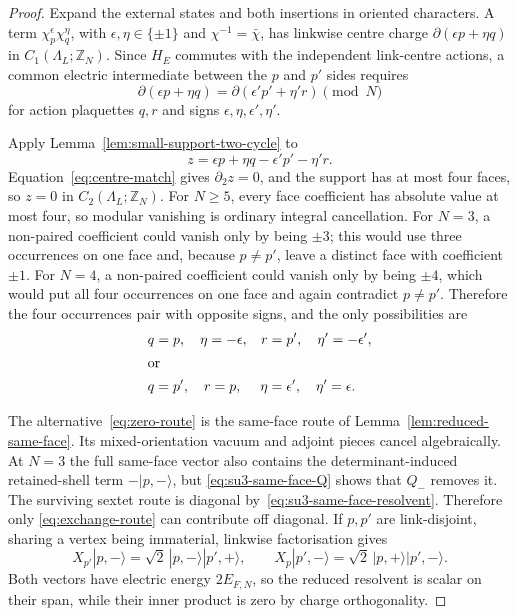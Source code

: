 \documentclass[11pt]{article}
\theoremstyle{plain}
\theoremstyle{definition}
\theoremstyle{remark}
\begin{document}
\begin{proof}
Expand the external states and both insertions in oriented characters. A term
$\chi_p^\epsilon\chi_q^\eta$, with
$\epsilon,\eta\in\{\pm1\}$ and $\chi^{-1}=\bar\chi$, has linkwise
centre charge $\partial(\epsilon p+\eta q)$ in
$C_1(\Lambda_L;\mathbb Z_N)$. Since $H_E$ commutes with the independent
link-centre actions, a common electric intermediate between the $p$ and $p'$
sides requires
\begin{equation}\label{eq:centre-match}
 \partial(\epsilon p+\eta q)
 =\partial(\epsilon'p'+\eta'r)\pmod N
\end{equation}
for action plaquettes $q,r$ and signs
$\epsilon,\eta,\epsilon',\eta'$.

Apply Lemma~\ref{lem:small-support-two-cycle} to
\[
 z=\epsilon p+\eta q-\epsilon'p'-\eta'r .
\]
Equation~\eqref{eq:centre-match} gives $\partial_2z=0$, and the support has at
most four faces, so $z=0$ in $C_2(\Lambda_L;\mathbb Z_N)$. For $N\ge5$,
every face coefficient has absolute value at most four, so modular vanishing
is ordinary integral cancellation. For $N=3$, a non-paired coefficient could
vanish only by being $\pm3$; this would use three occurrences on one face and,
because $p\ne p'$, leave a distinct face with coefficient $\pm1$. For $N=4$,
a non-paired coefficient could vanish only by being $\pm4$, which would put
all four occurrences on one face and again contradict $p\ne p'$. Therefore
the four occurrences pair with opposite signs, and the only possibilities are
\begin{align}
 q&=p,\quad \eta=-\epsilon,
 &r&=p',\quad \eta'=-\epsilon',
 \label{eq:zero-route}\\
 \intertext{or}
 q&=p',\quad r=p,
 &\eta&=\epsilon',\quad \eta'=\epsilon .
 \label{eq:exchange-route}
\end{align}

The alternative~\eqref{eq:zero-route} is the same-face route of
Lemma~\ref{lem:reduced-same-face}. Its mixed-orientation vacuum and adjoint
pieces cancel algebraically. At $N=3$ the full same-face vector also contains
the determinant-induced retained-shell term $-|p,-\rangle$, but
\eqref{eq:su3-same-face-Q} shows that $Q_-$ removes it. The surviving sextet
route is diagonal by~\eqref{eq:su3-same-face-resolvent}. Therefore only
\eqref{eq:exchange-route} can contribute off diagonal. If $p,p'$ are
link-disjoint, sharing
a vertex being immaterial, linkwise factorisation gives
\[
 X_{p'}|p,-\rangle=\sqrt2\,|p,-\rangle|p',+\rangle,
 \qquad
 X_p|p',-\rangle=\sqrt2\,|p,+\rangle|p',-\rangle .
\]
Both vectors have electric energy $2E_{F,N}$, so the reduced resolvent is
scalar on their span, while their inner product is zero by charge
orthogonality.


\end{proof}
\end{document}
